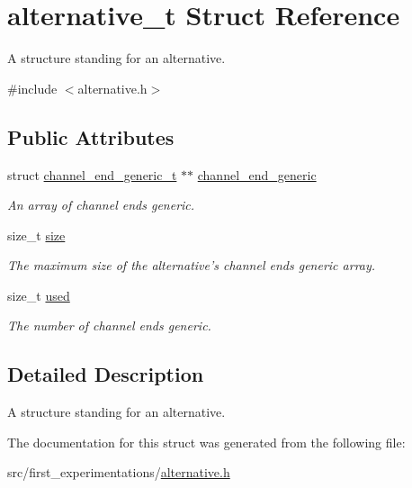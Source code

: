 \hypertarget{structalternative__t}{\section{alternative\-\_\-t Struct Reference}
\label{structalternative__t}
}


A structure standing for an alternative.  




{\ttfamily \#include $<$alternative.\-h$>$}

\subsection*{Public Attributes}
\begin{DoxyCompactItemize}
\item 
\hypertarget{structalternative__t_a38b43d51a3d5fd8bc344d51b2f837574}{struct \hyperlink{structchannel__end__generic__t}{channel\-\_\-end\-\_\-generic\-\_\-t} $\ast$$\ast$ \hyperlink{structalternative__t_a38b43d51a3d5fd8bc344d51b2f837574}{channel\-\_\-end\-\_\-generic}}\label{structalternative__t_a38b43d51a3d5fd8bc344d51b2f837574}

\begin{DoxyCompactList}\small\item\em An array of channel ends generic. \end{DoxyCompactList}\item 
\hypertarget{structalternative__t_aca939abbe3c58a9cff3444bbd8399462}{size\-\_\-t \hyperlink{structalternative__t_aca939abbe3c58a9cff3444bbd8399462}{size}}\label{structalternative__t_aca939abbe3c58a9cff3444bbd8399462}

\begin{DoxyCompactList}\small\item\em The maximum size of the alternative's channel ends generic array. \end{DoxyCompactList}\item 
\hypertarget{structalternative__t_ae7cdf9285b349c510db94f9f78a89630}{size\-\_\-t \hyperlink{structalternative__t_ae7cdf9285b349c510db94f9f78a89630}{used}}\label{structalternative__t_ae7cdf9285b349c510db94f9f78a89630}

\begin{DoxyCompactList}\small\item\em The number of channel ends generic. \end{DoxyCompactList}\end{DoxyCompactItemize}


\subsection{Detailed Description}
A structure standing for an alternative. 

The documentation for this struct was generated from the following file\-:\begin{DoxyCompactItemize}
\item 
src/first\-\_\-experimentations/\hyperlink{alternative_8h}{alternative.\-h}\end{DoxyCompactItemize}
